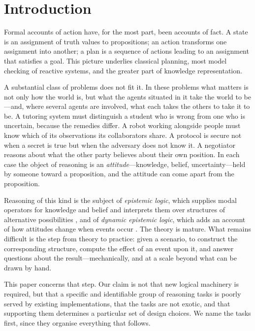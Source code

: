 \documentclass[11pt,a4paper]{article}
\begin{document}
\tableofcontents
\bigskip

\section{Introduction}
\label{sec:intro}

Formal accounts of action have, for the most part, been accounts of fact. A state is an
assignment of truth values to propositions; an action transforms one assignment into another;
a plan is a sequence of actions leading to an assignment that satisfies a goal. This picture
underlies classical planning, most model checking of reactive systems, and the greater part of
knowledge representation.

A substantial class of problems does not fit it. In these problems what matters is not only
how the world is, but what the agents situated in it take the world to be---and, where several
agents are involved, what each takes the others to take it to be. A tutoring system must
distinguish a student who is wrong from one who is uncertain, because the remedies differ. A
robot working alongside people must know which of its observations its collaborators share. A
protocol is secure not when a secret is true but when the adversary does not know it. A
negotiator reasons about what the other party believes about their own position. In each case
the object of reasoning is an \emph{attitude}---knowledge, belief, uncertainty---held by
someone toward a proposition, and the attitude can come apart from the proposition.

Reasoning of this kind is the subject of \emph{epistemic logic}, which supplies modal
operators for knowledge and belief and interprets them over structures of alternative
possibilities \citep{fagin1995}, and of \emph{dynamic epistemic logic}, which adds an account
of how attitudes change when events occur \citep{baltag1998,vanditmarsch2007}. The theory is
mature. What remains difficult is the step from theory to practice: given a scenario, to
construct the corresponding structure, compute the effect of an event upon it, and answer
questions about the result---mechanically, and at a scale beyond what can be drawn by hand.

This paper concerns that step. Our claim is not that new logical machinery is required, but
that a specific and identifiable group of reasoning tasks is poorly served by existing
implementations, that the tasks are not exotic, and that supporting them determines a
particular set of design choices. We name the tasks first, since they organise everything
that follows.
\end{document}
